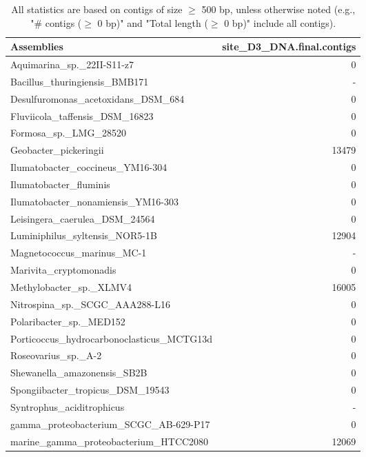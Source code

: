 \documentclass[12pt,a4paper]{article}
\begin{document}
\begin{table}[ht]
\begin{center}
\caption{All statistics are based on contigs of size $\geq$ 500 bp, unless otherwise noted (e.g., "\# contigs ($\geq$ 0 bp)" and "Total length ($\geq$ 0 bp)" include all contigs).}
\begin{tabular}{|l*{1}{|r}|}
\hline
Assemblies & site\_D3\_DNA.final.contigs \\ \hline
Aquimarina\_sp.\_22II-S11-z7 & 0 \\ \hline
Bacillus\_thuringiensis\_BMB171 & - \\ \hline
Desulfuromonas\_acetoxidans\_DSM\_684 & 0 \\ \hline
Fluviicola\_taffensis\_DSM\_16823 & 0 \\ \hline
Formosa\_sp.\_LMG\_28520 & 0 \\ \hline
Geobacter\_pickeringii & 13479 \\ \hline
Ilumatobacter\_coccineus\_YM16-304 & 0 \\ \hline
Ilumatobacter\_fluminis & 0 \\ \hline
Ilumatobacter\_nonamiensis\_YM16-303 & 0 \\ \hline
Leisingera\_caerulea\_DSM\_24564 & 0 \\ \hline
Luminiphilus\_syltensis\_NOR5-1B & 12904 \\ \hline
Magnetococcus\_marinus\_MC-1 & - \\ \hline
Marivita\_cryptomonadis & 0 \\ \hline
Methylobacter\_sp.\_XLMV4 & 16005 \\ \hline
Nitrospina\_sp.\_SCGC\_AAA288-L16 & 0 \\ \hline
Polaribacter\_sp.\_MED152 & 0 \\ \hline
Porticoccus\_hydrocarbonoclasticus\_MCTG13d & 0 \\ \hline
Roseovarius\_sp.\_A-2 & 0 \\ \hline
Shewanella\_amazonensis\_SB2B & 0 \\ \hline
Spongiibacter\_tropicus\_DSM\_19543 & 0 \\ \hline
Syntrophus\_aciditrophicus & - \\ \hline
gamma\_proteobacterium\_SCGC\_AB-629-P17 & 0 \\ \hline
marine\_gamma\_proteobacterium\_HTCC2080 & 12069 \\ \hline
\end{tabular}
\end{center}
\end{table}
\end{document}
